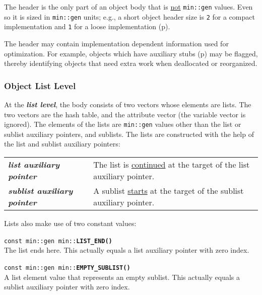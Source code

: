 \documentclass[12pt]{article}
\makeatletter
\newcommand{\key}[1]{{\bf \em #1}\index{#1}}
\newcommand{\ttindex}[1]{\index{#1@{\tt #1}}}
\newcommand{\minindex}[1]{\ttindex{min::#1}\ttindex{#1}}
\newcommand{\pagref}[1]{p\pageref{#1}}
\newenvironment{indpar}[1][0.3in]%
	{\begin{list}{}%
		     {\setlength{\itemsep}{0in}%
		      \setlength{\topsep}{0in}%
		      \setlength{\parsep}{1ex}%
		      \setlength{\labelwidth}{#1}%
		      \setlength{\leftmargin}{#1}%
		      \addtolength{\leftmargin}{\labelsep}}%
	 \item}%
	{\end{list}}
\newcommand{\LABEL}[1]{\label{#1}}
\newcommand{\MINKEY}[1]{{\tt \bf #1}\minindex{#1}}
\makeatother
\begin{document}
The header is the only part of an object body that is
\underline{not} \verb|min::gen| values.  Even so it is
sized in \verb|min::gen| units; e.g., a short object header size
is {\tt 2} for a compact implementation and {\tt 1}
for a loose implementation (\pagref{COMPACT-OR-LOOSE}).

The header may contain implementation dependent information used
for optimization.
For example, objects which have auxiliary stubs
(\pagref{OBJECT-AUXILIARY-STUBS})
may be flagged, thereby identifying objects that need extra work
when deallocated or reorganized.

\subsubsection{Object List Level}
\label{OBJECT-LIST-LEVEL}

At the \key{list level},\label{LIST-LEVEL}
the body consists of two vectors whose
elements are lists.  The two vectors are the hash table, and the
attribute vector (the variable vector is ignored).
The elements of the lists are
\verb|min::gen| values other than the list or sublist auxiliary
pointers, and sublists.  The lists are constructed with
the help of the list and sublist auxiliary pointers:

\begin{center}
\begin{tabular}{lp{3in}}
\key{list auxiliary pointer} &
The list is \underline{continued} at the target of the list auxiliary pointer.
\\[2ex]
\key{sublist auxiliary pointer}	&
A sublist \underline{starts} at the target of the sublist auxiliary pointer.
\end{tabular}
\end{center}

Lists also make use of two constant values:

\begin{indpar}
\begin{list}{}{}
\item[{\tt const min::gen min::}\MINKEY{LIST\_END()}]~\LABEL{MIN::LIST_END}\\
The list ends here.
This actually equals a list auxiliary pointer with zero index.
\item[{\tt const min::gen min::}\MINKEY{EMPTY\_SUBLIST()}]~%
	\LABEL{MIN::EMPTY_SUBLIST}\\
A list element value that represents an empty sublist.
This actually equals a sublist auxiliary pointer with zero index.
\end{list}
\end{indpar}
\end{document}

